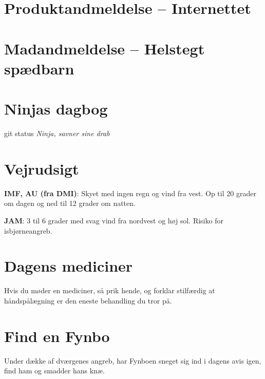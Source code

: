 

\begin{minipage}[b]{0.95\linewidth}
\begin{minipage}[t]{0.47\textwidth}
\vspace{3mm}
\section*{Produktandmeldelse -- Internettet}


\vspace{1mm}
\section*{Madandmeldelse -- Helstegt spædbarn}
\vspace{2mm}

\section*{Ninjas dagbog}
git status
{\flushright\emph{Ninja, savner sine drab}}

\end{minipage}%
\hfill\begin{minipage}[t]{0.47\textwidth}
\vspace{3mm}
\section*{Vejrudsigt}
\textbf{IMF, AU (fra DMI)}: Skyet med ingen regn og vind fra vest. Op til 20 grader om dagen og ned til 12 grader om natten.

\textbf{JAM}: 3 til 6 grader med svag vind fra nordvest og høj sol. Risiko for isbjørneangreb.

\vspace{-1mm}
\section*{Dagens mediciner}
Hvis du møder en mediciner, så prik hende, og forklar stilfærdig at håndspålægning er den eneste behandling du tror på.

\vspace{-1mm}
\section*{Find en Fynbo}
Under dække af dværgenes angreb, har Fynboen sneget sig ind i dagens avis igen, find ham og smadder hans knæ.


\end{minipage}
\end{minipage}
